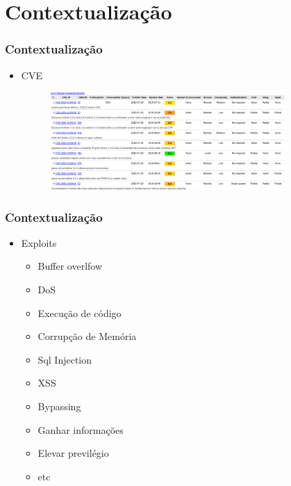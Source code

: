 \documentclass{beamer}
\begin{document}
\section{Contextualização}
\begin{frame}
	\frametitle{Contextualização}
	\begin{itemize}
		\item CVE
		\begin{figure}[htp]
			\includegraphics[width=9cm]{cve.png}
		\end{figure}
	\end{itemize}
\end{frame}

\begin{frame}
	\frametitle{Contextualização}
	\begin{itemize}
		\item Exploits
		\begin{itemize}
			\item Buffer overlfow
			\item DoS
			\item Execução de código
			\item Corrupção de Memória
			\item Sql Injection
			\item XSS
			\item Bypassing
			\item Ganhar informações
			\item Elevar previlégio
			\item etc
		\end{itemize}
	\end{itemize}
\end{frame}
\end{document}
